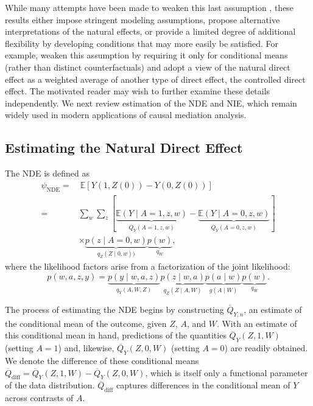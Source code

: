 \documentclass[
  12pt, krantz2,
]{krantz}
\newcommand{\E}{\mathbb{E}}
\newcommand{\1}{\mathbbm{1}}
\theoremstyle{definition}
\theoremstyle{definition}
\theoremstyle{definition}
\theoremstyle{definition}
\theoremstyle{remark}
\begin{document}
While many attempts have been made to weaken this last assumption
\citep{petersen2006estimation, imai2010identification, vansteelandt2012imputation, vansteelandt2012natural}, these results either impose stringent modeling
assumptions, propose alternative interpretations of the natural effects, or
provide a limited degree of additional flexibility by developing conditions that
may more easily be satisfied. For example, \citet{petersen2006estimation} weaken this
assumption by requiring it only for conditional means (rather than distinct
counterfactuals) and adopt a view of the natural direct effect as a weighted
average of another type of direct effect, the controlled direct effect. The
motivated reader may wish to further examine these details independently. We
next review estimation of the NDE and NIE, which remain widely used in modern
applications of causal mediation analysis.

\hypertarget{estimating-the-natural-direct-effect}{%
\subsection{Estimating the Natural Direct Effect}\label{estimating-the-natural-direct-effect}}

The NDE is defined as
\begin{align*}
  \psi_{\text{NDE}} =&~\E[Y(1, Z(0)) - Y(0, Z(0))] \\
  =& \sum_w \sum_z
  [\underbrace{\E(Y \mid A = 1, z, w)}_{\overline{Q}_Y(A = 1, z, w)} -
  \underbrace{\E(Y \mid A = 0, z, w)}_{\overline{Q}_Y(A = 0, z, w)}] \\
  &\times \underbrace{p(z \mid A = 0, w)}_{q_Z(Z \mid 0, w))}
  \underbrace{p(w)}_{q_W},
\end{align*}
where the likelihood factors arise from a factorization of the joint
likelihood:
\begin{equation*}
  p(w, a, z, y) = \underbrace{p(y \mid w, a, z)}_{q_Y(A, W, Z)}
  \underbrace{p(z \mid w, a)}_{q_Z(Z \mid A, W)}
  \underbrace{p(a \mid w)}_{g(A \mid W)}
  \underbrace{p(w)}_{q_W}.
\end{equation*}

The process of estimating the NDE begins by constructing \(\overline{Q}_{Y, n}\),
an estimate of the conditional mean of the outcome, given \(Z\), \(A\), and \(W\).
With an estimate of this conditional mean in hand, predictions of the
quantities \(\overline{Q}_Y(Z, 1, W)\) (setting \(A = 1\)) and,
likewise, \(\overline{Q}_Y(Z, 0, W)\) (setting \(A = 0\)) are readily obtained. We
denote the difference of these conditional means \(\overline{Q}_{\text{diff}} = \overline{Q}_Y(Z, 1, W) - \overline{Q}_Y(Z, 0, W)\), which is itself only a
functional parameter of the data distribution. \(\overline{Q}_{\text{diff}}\)
captures differences in the conditional mean of \(Y\) across contrasts of \(A\).
\end{document}
